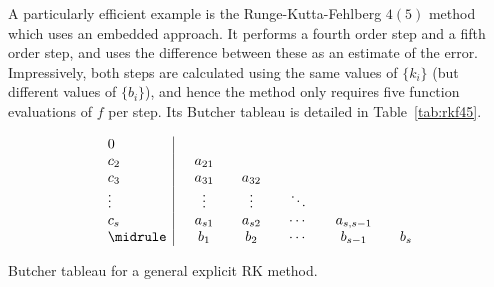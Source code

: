 A particularly efficient example is the Runge-Kutta-Fehlberg $4(5)$ method which uses an embedded approach. It performs a fourth order step and a fifth order step, and uses the difference between these as an estimate of the error. Impressively, both steps are calculated using the same values of $\{k_i\}$ (but different values of $\{b_i\}$), and hence the method only requires five function evaluations of $f$ per step. Its Butcher tableau is detailed in Table~\ref{tab:rkf45}.

\begin{table}[h]
  \begin{equation*}
    \begin{array}{l | c c c c c}
      0      \quad &               &              &              &         &   \\
      c_2    \quad & \quad a_{21}  &              &              &         &   \\
      c_3    \quad & \quad a_{31}  & \quad a_{32} &              &         &   \\
      \vdots \quad & \quad \vdots  & \quad \vdots & \quad \ddots &         &   \\
      c_s    \quad & \quad a_{s1}  & \quad a_{s2} & \quad \cdots & \quad a_{s,s-1} & \\ \midrule
      & \quad b_{1}   & \quad b_{2}  & \quad \cdots & \quad b_{s-1}  & \quad b_{s}
    \end{array}
  \end{equation*}
  \caption{Butcher tableau for a general explicit RK method.\label{tab:RKexplicit}
  }
\end{table}

